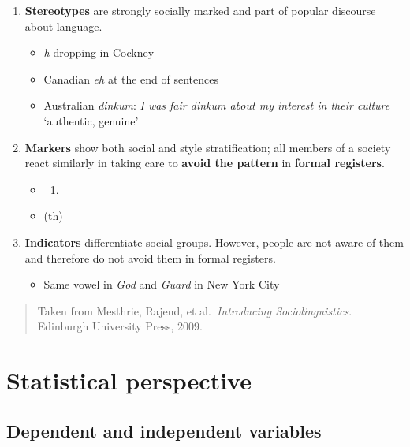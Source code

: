 \documentclass[
  11pt,
  letterpaper,
  DIV=11,
  numbers=noendperiod]{scrreprt}
\providecommand{\tightlist}{%
  \setlength{\itemsep}{0pt}\setlength{\parskip}{0pt}}\usepackage{longtable,booktabs,array}
\begin{document}
\begin{enumerate}
\def\labelenumi{\arabic{enumi}.}
\tightlist
\item
  \textbf{Stereotypes} are strongly socially marked and part of popular
  discourse about language.

  \begin{itemize}
  \tightlist
  \item
    \emph{h}-dropping in Cockney
  \item
    Canadian \emph{eh} at the end of sentences
  \item
    Australian \emph{dinkum}: \emph{I was fair dinkum about my interest
    in their culture} `authentic, genuine'
  \end{itemize}
\item
  \textbf{Markers} show both social and style stratification; all
  members of a society react similarly in taking care to \textbf{avoid
  the pattern} in \textbf{formal registers}.

  \begin{itemize}
  \item
    \begin{enumerate}
    \def\labelenumii{(\alph{enumii})}
    \setcounter{enumii}{17}
    \tightlist
    \item
    \end{enumerate}
  \item
    (th)
  \end{itemize}
\item
  \textbf{Indicators} differentiate social groups. However, people are
  not aware of them and therefore do not avoid them in formal registers.

  \begin{itemize}
  \tightlist
  \item
    Same vowel in \emph{God} and \emph{Guard} in New York City
  \end{itemize}
\end{enumerate}

\begin{quote}
Taken from Mesthrie, Rajend, et al.~\emph{Introducing Sociolinguistics}.
Edinburgh University Press, 2009.
\end{quote}

\section{Statistical perspective}\label{statistical-perspective}

\subsection{Dependent and independent
variables}\label{dependent-and-independent-variables}
\end{document}

